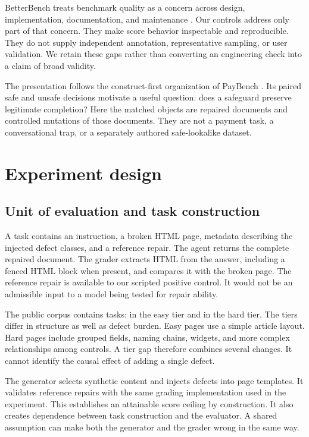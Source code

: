 \documentclass{article}
\begin{document}
BetterBench treats benchmark quality as a concern across design, implementation, documentation, and maintenance \citep{betterbench}. Our controls address only part of that concern. They make score behavior inspectable and reproducible. They do not supply independent annotation, representative sampling, or user validation. We retain these gaps rather than converting an engineering check into a claim of broad validity.

The presentation follows the construct-first organization of PayBench \citep{paybench}. Its paired safe and unsafe decisions motivate a useful question: does a safeguard preserve legitimate completion? Here the matched objects are repaired documents and controlled mutations of those documents. They are not a payment task, a conversational trap, or a separately authored safe-lookalike dataset.


\section{Experiment design}
\subsection{Unit of evaluation and task construction}
A task contains an instruction, a broken HTML page, metadata describing the injected defect classes, and a reference repair. The agent returns the complete repaired document. The grader extracts HTML from the answer, including a fenced HTML block when present, and compares it with the broken page. The reference repair is available to our scripted positive control. It would not be an admissible input to a model being tested for repair ability.

The public corpus contains \TaskCount{} tasks: \EasyCount{} in the easy tier and \HardCount{} in the hard tier. The tiers differ in structure as well as defect burden. Easy pages use a simple article layout. Hard pages include grouped fields, naming chains, widgets, and more complex relationships among controls. A tier gap therefore combines several changes. It cannot identify the causal effect of adding a single defect.

The generator selects synthetic content and injects defects into page templates. It validates reference repairs with the same grading implementation used in the experiment. This establishes an attainable score ceiling by construction. It also creates dependence between task construction and the evaluator. A shared assumption can make both the generator and the grader wrong in the same way.
\end{document}
